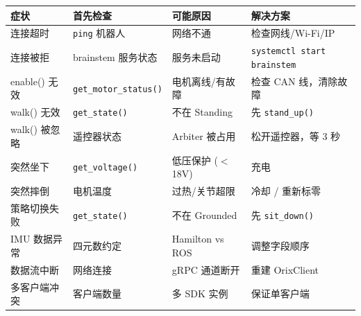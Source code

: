 \documentclass[a4paper,11pt,openany]{book}
\begin{document}
{\small
\begin{longtable}{llll}
\toprule
症状 & 首先检查 & 可能原因 & 解决方案 \\
\midrule
\endhead
连接超时 & \texttt{ping} 机器人 & 网络不通 & 检查网线/Wi-Fi/IP \\
连接被拒 & brainstem 服务状态 & 服务未启动 & \texttt{systemctl start brainstem} \\
enable() 无效 & \texttt{get\_motor\_status()} & 电机离线/有故障 & 检查 CAN 线，清除故障 \\
walk() 无效 & \texttt{get\_state()} & 不在 Standing & 先 \texttt{stand\_up()} \\
walk() 被忽略 & 遥控器状态 & Arbiter 被占用 & 松开遥控器，等 3 秒 \\
突然坐下 & \texttt{get\_voltage()} & 低压保护 ($<$ 18V) & 充电 \\
突然摔倒 & 电机温度 & 过热/关节超限 & 冷却 / 重新标零 \\
策略切换失败 & \texttt{get\_state()} & 不在 Grounded & 先 \texttt{sit\_down()} \\
IMU 数据异常 & 四元数约定 & Hamilton vs ROS & 调整字段顺序 \\
数据流中断 & 网络连接 & gRPC 通道断开 & 重建 OrixClient \\
多客户端冲突 & 客户端数量 & 多 SDK 实例 & 保证单客户端 \\
\bottomrule
\end{longtable}
}

\end{document}
